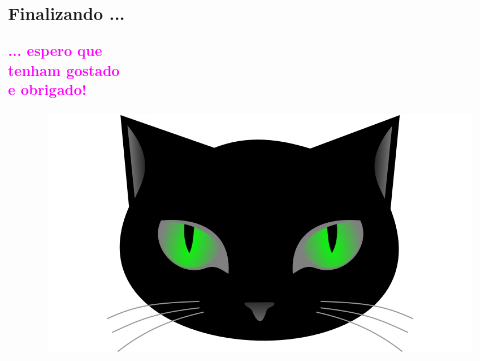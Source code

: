\begin{frame}[fragile]
  \frametitle{Finalizando ...}


\begin{minipage}{0.47\textwidth}

\begin{Large}
\textbf{\textcolor{magenta}{... espero que\\ tenham gostado\\ e obrigado!}}
\end{Large}

\end{minipage}
\begin{minipage}{0.5\textwidth}
\begin{figure}[ht!]
\begin{center}
\includegraphics[width=1.2\textwidth, height=0.40\textheight]{figures/logo_picat_alex.jpg}
\end{center}
\end{figure}
\end{minipage}

\end{frame}
					
